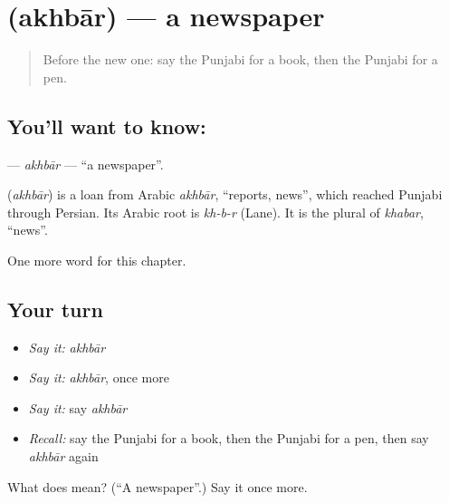 \section[\texorpdfstring{\pa{ਅਖ਼ਬਾਰ} (akhbār)}{ਅਖ਼ਬਾਰ (akhbār)}]{ (akhbār) — a newspaper}

\label{lesson:PA-C71-akhbar}



\begin{quote}
Before the new one: say the Punjabi for a book, then the Punjabi for a pen.
\end{quote}

\subsection*{You'll want to know: }
\textbf{} — \emph{akhbār} — \textquotedblleft{}a newspaper\textquotedblright{}.

\begin{cousinweb}
\textbf{} (\emph{akhbār}) is a loan from Arabic \emph{akhbār}, \textquotedblleft{}reports, news\textquotedblright{}, which reached Punjabi through Persian. Its Arabic root is \emph{kh-b-r} (Lane). It is the plural of \emph{khabar}, \textquotedblleft{}news\textquotedblright{}.
\end{cousinweb}

\begin{grammarlens}[title={What you've built}]
One more word for this chapter.
\end{grammarlens}

\subsection*{Your turn}
\begin{itemize}
\raggedright
  \item \emph{Say it:} \emph{akhbār}
  \item \emph{Say it:} \emph{akhbār}, once more
  \item \emph{Say it:} say \emph{akhbār}
  \item \emph{Recall:} say the Punjabi for a book, then the Punjabi for a pen, then say \emph{akhbār} again
\end{itemize}

\begin{tcolorbox}[breakable,colback=teal!4,colframe=teal!35!black,title={Before you move on}]
What does  mean? (\textquotedblleft{}A newspaper\textquotedblright{}.) Say it once more.
\end{tcolorbox}
